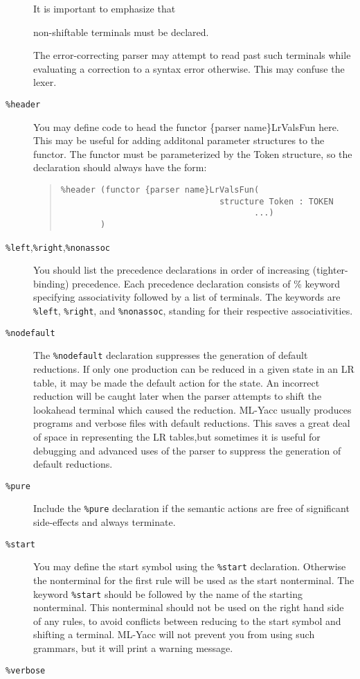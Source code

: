 \begin{description}
It is important to emphasize that
\begin{em}
non-shiftable terminals must be declared.
\end{em}
The error-correcting parser may attempt to read past such terminals
while evaluating a correction to a syntax error otherwise.  This may
confuse the lexer.
\item[{\tt \%header}]
You may define code to head the functor \{parser name\}LrValsFun here.  This
may be useful for adding additonal parameter structures to the functor.
The functor must be parameterized by the Token structure, so
the declaration should always have the form:
\begin{quote}
\begin{verbatim}
%header (functor {parser name}LrValsFun(
                                structure Token : TOKEN
                                       ...) 
        )
\end{verbatim}
\end{quote}

\item[{\tt \%left},{\tt \%right},{\tt \%nonassoc}]
You should list the precedence declarations in order of increasing (tighter-binding)
precedence.  Each precedence declaration consists
of \% keyword specifying associativity followed by a list of terminals.
The keywords are {\tt \%left}, {\tt \%right}, and {\tt \%nonassoc},
standing for their respective associativities.
\item[{\tt \%nodefault}]
The {\tt \%nodefault} declaration suppresses the generation of default
reductions.  If only one production can be reduced in a given state in
an LR table, it may be made the default action for the state.  An incorrect
reduction will be caught later when the parser attempts to shift the lookahead
terminal which caused the reduction. ML-Yacc usually produces programs and
verbose files with default reductions.  This saves a great deal of
space in representing the LR tables,but
sometimes it is useful for debugging and advanced
uses of the parser to suppress the generation of default reductions.
\item[{\tt \%pure}]
Include the {\tt \%pure} declaration if the semantic actions
are free of significant side-effects and always terminate.
\item[{\tt \%start}]
You may define the start symbol using
the {\tt \%start} declaration.  Otherwise the nonterminal for the
first rule will be used as the start nonterminal.
The keyword {\tt \%start} should be followed by the name of the starting
nonterminal.  This nonterminal should not be used on the right hand
side of any rules, to avoid conflicts between reducing to the start
symbol and shifting a terminal.  ML-Yacc will not prevent you
from using such grammars, but it will print a warning message.
\item[{\tt \%verbose}]


\end{description}
